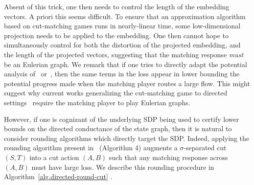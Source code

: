 \documentclass[letterpaper]{article}
\begin{document}
Absent of this trick, one then needs to control the length of the embedding vectors. A priori this seems difficult. To ensure that an approximation algorithm based on cut-matching games runs in nearly-linear time, some low-dimensional projection needs to be applied to the embedding. One then cannot hope to simultaneously control for both the distortion of the projected embedding, and the length of the projected vectors, suggesting that the matching response \emph{must} be an Eulerian graph. We remark that if one tries to directly adapt the potential analysis of~\cite{khandekarGraphPartitioningUsing2009} or~\cite{orecchiaPartitioningGraphsSingle2008}, then the same terms in the loss appear in lower bounding the potential progress made when the matching player routes a large flow. This might suggest why current works generalizing the cut-matching game to directed settings~\cite{louis2010cut, lau2023fast} require the matching player to play Eulerian graphs.

However, if one is cognizant of the underlying SDP being used to certify lower bounds on the directed conductance of the state graph, then it is natural to consider rounding algorithms which directly target the SDP. Indeed, applying the rounding algorithm present in~\cite{agarwal2005log} (Algorithm 4) augments a $\sigma$-separated cut $(S, T)$ into a cut action $(A, B)$ such that any matching response across $(A, B)$ must have large loss. We describe this rounding procedure in Algorithm~\ref{alg.directed-round-cut} \dirroundcut.

\begin{figure}[h]
\centering
\noindent{}
\label{fig:directed-round-cut}
\end{figure}
\end{document}
